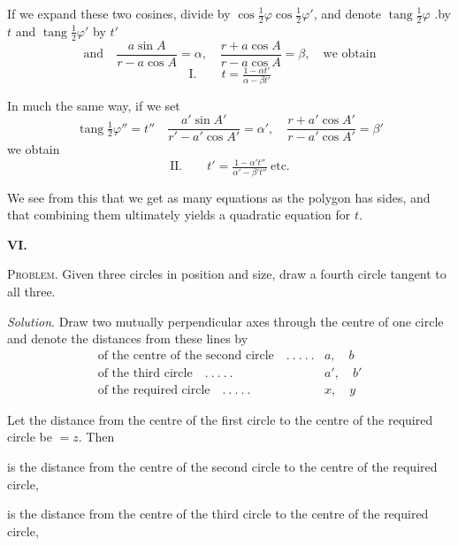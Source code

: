 %
\par
If we expand these two cosines, divide by \(\cos\tfrac12\varphi\cos\tfrac12\varphi'\), and denote \(\operatorname{tang}\tfrac12\varphi\) .by \(t\) and \(\operatorname{tang}\tfrac12\varphi'\) by \(t'\)
\[
\text{and}\quad\frac{a\sin A}{r-a\cos A}=\alpha,\quad\frac{r+a\cos A}{r-a\cos A}=\beta,\quad\text{we obtain}
\]
\[
\text{I.}\qquad t=\tfrac{1-\alpha t'}{\alpha-\beta t'}
\]
\par
In much the same way, if we set
\[
\operatorname{tang}\tfrac12\varphi''=t''\quad\frac{a'\sin A'}{r'-a'\cos A'}=\alpha',\quad\frac{r+a'\cos A'}{r-a'\cos A'}=\beta'
\]
we obtain
\[
\text{II.}\qquad t'=\tfrac{1-\alpha't''}{\alpha'-\beta't''}\ \text{etc.}
\]
\par
We see from this that we get as many equations as the polygon has sides, and that combining them ultimately yields a quadratic equation for \(t\).
\par\medskip{}
\centerline{\textbf{VI.}}\nobreak\smallskip
\textsc{Problem}. Given three circles in position and size, draw a fourth circle tangent to all three.

\textit{Solution}. Draw two mutually perpendicular axes through the centre of one circle and denote the distances from these lines by
\[
\begin{array}{rl}
\text{of the centre of the second circle}\quad .\ .\ .\ .\ .&a,\quad b\\
\text{of the third circle}\quad .\ .\ .\ .\ .&a',\quad b'\\
\text{of the required circle}\quad .\ .\ .\ .\ .&x,\quad y
\end{array}
\]
\par
Let the distance from the centre of the first circle to the centre of the required circle be \(=z\). Then
\begin{list}{}{\setlength{\leftmargin}{3em}\setlength{\labelwidth}{2.5em}\setlength{\labelsep}{.5em}}
\item[\(z-c\)] is the distance from the centre of the second circle to the centre of the required circle,
\item[\(z-c'\)] is the distance from the centre of the third circle to the centre of the required circle,
\end{list}
